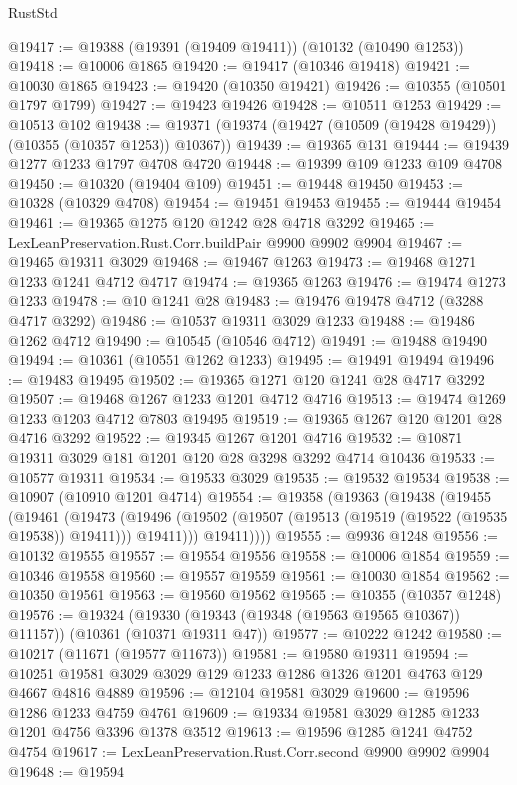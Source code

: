 \begin{lexlean}{RustStd}
\begin{coremodule}
@19417 := @19388 (@19391 (@19409 @19411)) (@10132 (@10490 @1253))
@19418 := @10006 @1865
@19420 := @19417 (@10346 @19418)
@19421 := @10030 @1865
@19423 := @19420 (@10350 @19421)
@19426 := @10355 (@10501 @1797 @1799)
@19427 := @19423 @19426
@19428 := @10511 @1253
@19429 := @10513 @102
@19438 := @19371 (@19374 (@19427 (@10509 (@19428 @19429)) (@10355 (@10357 @1253)) @10367))
@19439 := @19365 @131
@19444 := @19439 @1277 @1233 @1797 @4708 @4720
@19448 := @19399 @109 @1233 @109 @4708
@19450 := @10320 (@19404 @109)
@19451 := @19448 @19450
@19453 := @10328 (@10329 @4708)
@19454 := @19451 @19453
@19455 := @19444 @19454
@19461 := @19365 @1275 @120 @1242 @28 @4718 @3292
@19465 := LexLeanPreservation.Rust.Corr.buildPair @9900 @9902 @9904
@19467 := @19465 @19311 @3029
@19468 := @19467 @1263
@19473 := @19468 @1271 @1233 @1241 @4712 @4717
@19474 := @19365 @1263
@19476 := @19474 @1273 @1233
@19478 := @10 @1241 @28
@19483 := @19476 @19478 @4712 (@3288 @4717 @3292)
@19486 := @10537 @19311 @3029 @1233
@19488 := @19486 @1262 @4712
@19490 := @10545 (@10546 @4712)
@19491 := @19488 @19490
@19494 := @10361 (@10551 @1262 @1233)
@19495 := @19491 @19494
@19496 := @19483 @19495
@19502 := @19365 @1271 @120 @1241 @28 @4717 @3292
@19507 := @19468 @1267 @1233 @1201 @4712 @4716
@19513 := @19474 @1269 @1233 @1203 @4712 @7803 @19495
@19519 := @19365 @1267 @120 @1201 @28 @4716 @3292
@19522 := @19345 @1267 @1201 @4716
@19532 := @10871 @19311 @3029 @181 @1201 @120 @28 @3298 @3292 @4714 @10436
@19533 := @10577 @19311
@19534 := @19533 @3029
@19535 := @19532 @19534
@19538 := @10907 (@10910 @1201 @4714)
@19554 := @19358
    (@19363
      (@19438
        (@19455
          (@19461
            (@19473
              (@19496 (@19502 (@19507 (@19513 (@19519 (@19522 (@19535 @19538)) @19411))) @19411)))
            @19411))))
@19555 := @9936 @1248
@19556 := @10132 @19555
@19557 := @19554 @19556
@19558 := @10006 @1854
@19559 := @10346 @19558
@19560 := @19557 @19559
@19561 := @10030 @1854
@19562 := @10350 @19561
@19563 := @19560 @19562
@19565 := @10355 (@10357 @1248)
@19576 := @19324
    (@19330 (@19343 (@19348 (@19563 @19565 @10367)) @11157))
    (@10361 (@10371 @19311 @47))
@19577 := @10222 @1242
@19580 := @10217 (@11671 (@19577 @11673))
@19581 := @19580 @19311
@19594 := @10251 @19581 @3029 @3029 @129 @1233 @1286 @1326 @1201 @4763 @129 @4667 @4816 @4889
@19596 := @12104 @19581 @3029
@19600 := @19596 @1286 @1233 @4759 @4761
@19609 := @19334 @19581 @3029 @1285 @1233 @1201 @4756 @3396 @1378 @3512
@19613 := @19596 @1285 @1241 @4752 @4754
@19617 := LexLeanPreservation.Rust.Corr.second @9900 @9902 @9904
@19648 := @19594

\end{coremodule}
\end{lexlean}
